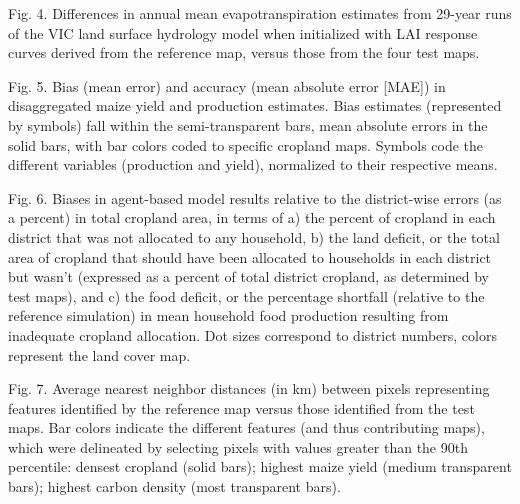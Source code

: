 \documentclass[12 pt, titlepage, a4paper]{article}
\begin{document}
\vspace{10pt}
\noindent Fig. 4. Differences in annual mean evapotranspiration estimates from 29-year runs of the VIC land surface hydrology model when initialized with LAI response curves derived from the reference map, versus those from the four test maps.

\vspace{10pt}
\noindent Fig. 5. Bias (mean error) and accuracy (mean absolute error [MAE]) in disaggregated maize yield and production estimates. Bias estimates (represented by symbols) fall within the semi-transparent bars, mean absolute errors in the solid bars, with bar colors coded to specific cropland maps.  Symbols code the different variables (production and yield), normalized to their respective means.

\vspace{10pt}
\noindent Fig. 6. Biases in agent-based model results relative to the district-wise errors (as a percent) in total cropland area, in terms of a) the percent of cropland in each district that was not allocated to any household, b) the land deficit, or the total area of cropland that should have been allocated to households in each district but wasn't (expressed as a percent of total district cropland, as determined by test maps), and c) the food deficit, or the percentage shortfall (relative to the reference simulation) in mean household food production resulting from inadequate cropland allocation. Dot sizes correspond to district numbers, colors represent the land cover map.

\vspace{10pt}
\noindent Fig. 7. Average nearest neighbor distances (in km) between pixels representing features identified by the reference map versus those identified from the test maps. Bar colors indicate the different features (and thus contributing maps), which were delineated by selecting pixels with values greater than the 90th percentile: densest cropland (solid bars); highest maize yield (medium transparent bars); highest carbon density (most transparent bars).
\end{document}
